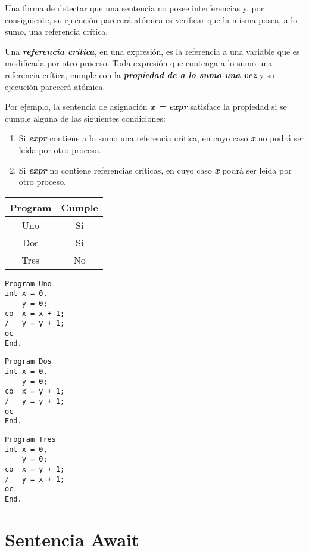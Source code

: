 \documentclass[a4paper, 10pt]{report}
\begin{document}
Una forma de detectar que una sentencia no posee interferencias y, por consiguiente, su ejecución parecerá atómica es verificar que la misma posea, a lo sumo, una referencia crítica.

Una \textbf{\emph{referencia crítica}}, en una expresión, es la referencia a una variable que es modificada por otro proceso. Toda expresión que contenga a lo sumo una referencia crítica, cumple con la \textbf{\emph{propiedad de a lo sumo una vez}} y su ejecución parecerá atómica.

Por ejemplo, la sentencia de asignación \textbf{\emph{x = expr}} satisface la propiedad si se cumple alguna de las siguientes condiciones:

\begin{enumerate}
    \item Si \textbf{\emph{expr}} contiene a lo sumo una referencia crítica, en cuyo caso \textbf{\emph{x}} no podrá ser leída por otro proceso.
    \item Si \textbf{\emph{expr}} no contiene referencias críticas, en cuyo caso \textbf{\emph{x}} podrá ser leída por otro proceso.
\end{enumerate}

\begin{multicols}{4}
{\renewcommand{\arraystretch}{1.7}%
\centering
\begin{tabular}{cc}
    \textbf{Program} & \textbf{Cumple}\\
    \hline 
    Uno & Si\\ 
    Dos & Si\\ 
    Tres & No\\
\end{tabular}}
\columnbreak
\begin{lstlisting}
Program Uno
int x = 0,
    y = 0;
co  x = x + 1;
/   y = y + 1;
oc
End.
\end{lstlisting}
\columnbreak
\begin{lstlisting}
Program Dos
int x = 0,
    y = 0;
co  x = y + 1;
/   y = y + 1;
oc
End.
\end{lstlisting}
\columnbreak
\begin{lstlisting}
Program Tres
int x = 0,
    y = 0;
co  x = y + 1;
/   y = x + 1;
oc
End.
\end{lstlisting}
\end{multicols}

\section{Sentencia Await}
\end{document}
